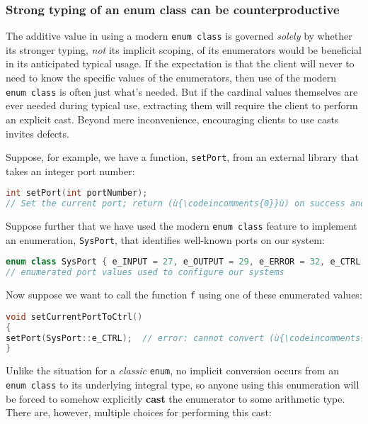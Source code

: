\subsubsection[Strong typing of an {\tt enum} {\tt class} can be counterproductive]{Strong typing of an {\SubsubsecCode enum} {\SubsubsecCode class} can be counterproductive}\label{strong-typing-of-an-enum-class-can-be-counterproductive}

The additive value in using a modern \texttt{enum}~\texttt{class} is
governed \emph{solely} by whether its stronger typing, \emph{not} its
implicit scoping, of its enumerators would be beneficial in its
anticipated typical usage. If the expectation is that the client will
never to need to know the specific values of the enumerators, then use
of the modern \texttt{enum}~\texttt{class} is often just what's needed.
But if the cardinal values themselves are ever needed during typical
use, extracting them will require the client to perform an explicit
cast. Beyond mere inconvenience, encouraging clients to use casts
invites defects.

Suppose, for example, we have a function, \texttt{setPort}, from an
external library that takes an integer port number:

\begin{lstlisting}[language=C++]
int setPort(int portNumber);
// Set the current port; return (ù{\codeincomments{0}}ù) on success and a nonzero value otherwise.
\end{lstlisting}

\noindent Suppose further that we have used the modern
\texttt{enum}~\texttt{class} feature to implement an enumeration,
\texttt{SysPort}, that identifies well-known ports on our system:

\begin{lstlisting}[language=C++]
enum class SysPort { e_INPUT = 27, e_OUTPUT = 29, e_ERROR = 32, e_CTRL = 6 };
// enumerated port values used to configure our systems
\end{lstlisting}

\noindent Now suppose we want to call the function \texttt{f} using one of these
enumerated values:

\begin{lstlisting}[language=C++]
void setCurrentPortToCtrl()
{
setPort(SysPort::e_CTRL);  // error: cannot convert (ù{\codeincomments{SetPort}}ù) to (ù{\codeincomments{int}}ù)
}
\end{lstlisting}

\noindent Unlike the situation for a \emph{classic} \texttt{enum}, no implicit
conversion occurs from an \texttt{enum}~\texttt{class} to its underlying
integral type, so anyone using this enumeration will be forced to
somehow explicitly \textbf{cast} the enumerator to some arithmetic type.
There are, however, multiple choices for performing this cast:


